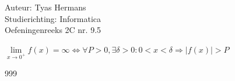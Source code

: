 \documentclass[a4paper]{article}
\begin{document}
  
\noindent \large Auteur: Tyas Hermans \\
\noindent \large Studierichting: Informatica\\
\noindent \large Oefeningenreeks 2C nr. 9.5\\

\medskip

\normalsize

$\lim\limits_{x\rightarrow 0^+}f(x)= \infty \Leftrightarrow \forall P > 0, \exists \delta > 0: 0 < x < \delta \Rightarrow |f(x)|>P$\\



\begin{thebibliography}{999}
\end{thebibliography}
\end{document}
